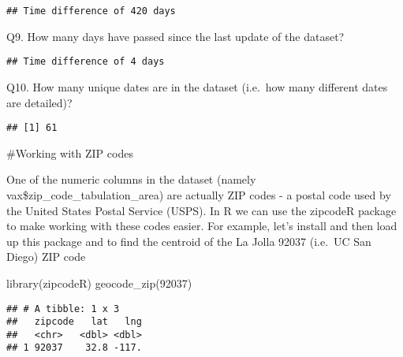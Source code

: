 \documentclass[
]{article}
\newenvironment{Shaded}{\begin{snugshade}}{\end{snugshade}}
\newcommand{\FunctionTok}[1]{\textcolor[rgb]{0.00,0.00,0.00}{#1}}
\newcommand{\NormalTok}[1]{#1}
\newcommand{\SpecialCharTok}[1]{\textcolor[rgb]{0.00,0.00,0.00}{#1}}
\newcommand{\StringTok}[1]{\textcolor[rgb]{0.31,0.60,0.02}{#1}}
\begin{document}
\begin{verbatim}
## Time difference of 420 days
\end{verbatim}

Q9. How many days have passed since the last update of the dataset?

\begin{Shaded}
\end{Shaded}

\begin{verbatim}
## Time difference of 4 days
\end{verbatim}

Q10. How many unique dates are in the dataset (i.e.~how many different
dates are detailed)?

\begin{Shaded}
\end{Shaded}

\begin{verbatim}
## [1] 61
\end{verbatim}

\#Working with ZIP codes

One of the numeric columns in the dataset (namely
vax\$zip\_code\_tabulation\_area) are actually ZIP codes - a postal code
used by the United States Postal Service (USPS). In R we can use the
zipcodeR package to make working with these codes easier. For example,
let's install and then load up this package and to find the centroid of
the La Jolla 92037 (i.e.~UC San Diego) ZIP code

\begin{Shaded}
\begin{Highlighting}[]
\FunctionTok{library}\NormalTok{(zipcodeR)}
\FunctionTok{geocode\_zip}\NormalTok{(}\StringTok{\textquotesingle{}92037\textquotesingle{}}\NormalTok{)}
\end{Highlighting}
\end{Shaded}

\begin{verbatim}
## # A tibble: 1 x 3
##   zipcode   lat   lng
##   <chr>   <dbl> <dbl>
## 1 92037    32.8 -117.
\end{verbatim}
\end{document}
